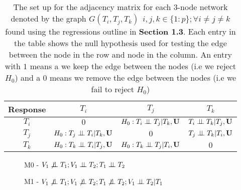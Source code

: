 \documentclass[12pt]{report}
\begin{document}
\begin{table}[H]
\centering
\caption{ The set up for the adjacency matrix for each 3-node network denoted by the graph $G(T_i, T_j, T_k) \ \ i,j,k\in\{1:p\}; \forall i\neq j\neq k$ found using the regressions outline in \textbf{Section 1.3}. Each entry in the table shows the null hypothesis used for testing the edge between the node in the row and node in the column. An entry with $1$ means a we keep the edge between the nodes (i.e we reject $H_0$) and a $0$ means we remove the edge between the nodes (i.e we fail to reject $H_0$)}
\begin{tabular}{|c||c|c|c|}
\hline
\bf Response  & $T_i$                                                 &  $T_j$                                           & $T_k$    \\ \hline \hline
$T_i$                &  $0$                                                  & $H_0: T_i \perp \!\!\! \perp T_j|T_k, {\bf U}$   & $T_i\perp \!\!\! \perp T_k |T_j, {\bf U}$                    \\ \hline 
$T_j$               &  $H_0: T_j \perp \!\!\! \perp T_i| T_k, {\bf U}$    &  $0$                                               & $T_j\perp \!\!\! \perp T_k|T_i, {\bf U}$                 \\ \hline
$T_k$               & $H_0: T_k \perp \!\!\! \perp T_i|T_j, {\bf U}$      &  $H_0: T_k \perp \!\!\! \perp T_j|T_i, {\bf U}$  & $0$                \\ \hline


\end{tabular}
\end{table}

\begin{figure}[H]
\begin{center}
\end{center}
\caption{M0 - $V_1\not\indep T_1 ; V_1 \indep T_2; T_1 \indep T_2$ }
\end{figure}


\begin{figure}[H]
\begin{center}
\end{center}
\caption{M1 - $V_1\not\indep T_1 ; V_1 \not\indep T_2; T_1 \not\indep T_2; V_1 \indep T_2 | T_1$}
\end{figure}
\end{document}
